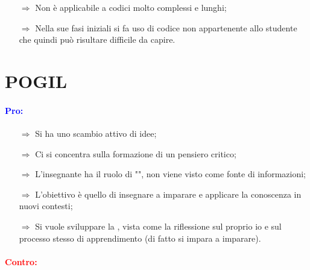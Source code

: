 \begin{itemize}
    \item [$\Rightarrow$] Non è applicabile a codici molto complessi e lunghi;
    \item [$\Rightarrow$] Nella sue fasi iniziali si fa uso di codice non appartenente allo studente che quindi può risultare difficile da capire.
\end{itemize}

\section{POGIL}


\paragraph{\textcolor{blue}{Pro:}}

\begin{itemize}
    \item [$\Rightarrow$] Si ha uno scambio attivo di idee;
    \item [$\Rightarrow$] Ci si concentra sulla formazione di un pensiero critico;
    \item [$\Rightarrow$] L'insegnante ha il ruolo di "", non viene visto come fonte di informazioni;
    \item [$\Rightarrow$] L'obiettivo è quello di insegnare a imparare e applicare la conoscenza in nuovi contesti;
    \item [$\Rightarrow$] Si vuole sviluppare la , vista come la riflessione sul proprio io e sul processo stesso di apprendimento (di fatto si impara a imparare).
\end{itemize}

\paragraph{\textcolor{red}{Contro:}}

